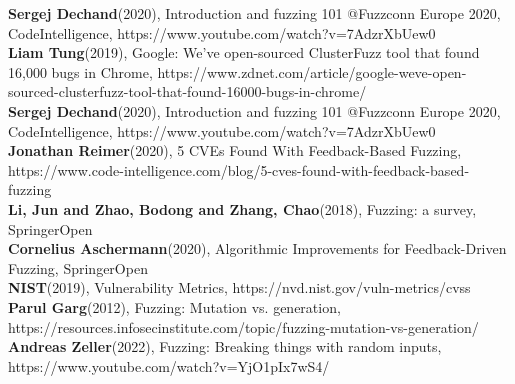 \documentclass[journal=tosc,final]{iacrtrans}
\begin{document}
\noindent [5] \textbf{Sergej Dechand}(2020), Introduction and fuzzing 101 @Fuzzconn Europe 2020, CodeIntelligence, https://www.youtube.com/watch?v=7AdzrXbUew0
\\

\noindent [6] \textbf{Liam Tung}(2019),  Google: We've open-sourced ClusterFuzz tool that found 16,000 bugs in Chrome, https://www.zdnet.com/article/google-weve-open-sourced-clusterfuzz-tool-that-found-16000-bugs-in-chrome/
\\

\noindent [7] \textbf{Sergej Dechand}(2020), Introduction and fuzzing 101 @Fuzzconn Europe 2020, CodeIntelligence, https://www.youtube.com/watch?v=7AdzrXbUew0
\\

\noindent[8] \textbf{Jonathan Reimer}(2020), 5 CVEs Found With Feedback-Based Fuzzing, https://www.code-intelligence.com/blog/5-cves-found-with-feedback-based-fuzzing
\\

\noindent[9] \textbf{Li, Jun and Zhao, Bodong and Zhang, Chao}(2018),     Fuzzing: a survey, SpringerOpen
\\


\noindent[10] \textbf{Cornelius Aschermann}(2020), Algorithmic Improvements for
Feedback-Driven Fuzzing, SpringerOpen
\\

\noindent[11] \textbf{NIST}(2019), Vulnerability Metrics, https://nvd.nist.gov/vuln-metrics/cvss
\\

\noindent[12] \textbf{Parul Garg}(2012), Fuzzing: Mutation vs. generation, https://resources.infosecinstitute.com/topic/fuzzing-mutation-vs-generation/
\\

\noindent[13] \textbf{Andreas Zeller}(2022), Fuzzing: Breaking things with random inputs, https://www.youtube.com/watch?v=YjO1pIx7wS4/
\\
\end{document}
